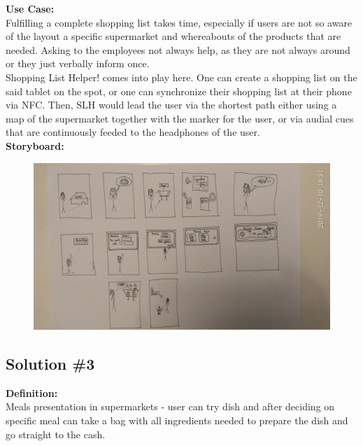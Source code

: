 \documentclass[a4paper,10pt,oneside]{scrreprt}
\begin{document}
			\noindent \textbf{Use Case:}\\
			Fulfilling a complete shopping list takes time, especially if users are not so aware of the layout a specific supermarket and whereabouts of the products that are needed. Asking to the employees not always help, as they are not always around or they just verbally inform once.\\
			
			Shopping List Helper! comes into play here. One can create a shopping list on the said tablet on the spot, or one can synchronize their shopping list at their phone via NFC. Then, SLH would lead the user via the shortest path either using a map of the supermarket together with the marker for the user, or via audial cues that are continuously feeded to the headphones of the user.\\
			
			\noindent \textbf{Storyboard:}\\
			
			\begin{figure}[h]
				\centering
				\includegraphics[scale=0.16, clip, trim={30em 0em 65em 10em}]{images/s2.jpg}
			\end{figure}
		
		\clearpage
		
		\subsection{Solution \#3}
		
		\noindent \textbf{Definition:}\\
			Meals presentation in supermarkets - user can try dish and after deciding on specific meal can take a bag with all ingredients needed to prepare the dish and go straight to the cash.\\
			
\end{document}
